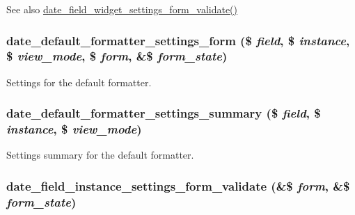 \begin{DoxySeeAlso}{See also}
\hyperlink{date__admin_8inc_a20ea5e4f157140ba68146345059d7a36}{date\_\-field\_\-widget\_\-settings\_\-form\_\-validate()} 
\end{DoxySeeAlso}
\hypertarget{date__admin_8inc_a59e2bd7bef099374be5eb236b835e72b}{
\subsubsection[{date\_\-default\_\-formatter\_\-settings\_\-form}]{\setlength{\rightskip}{0pt plus 5cm}date\_\-default\_\-formatter\_\-settings\_\-form (\$ {\em field}, \/  \$ {\em instance}, \/  \$ {\em view\_\-mode}, \/  \$ {\em form}, \/  \&\$ {\em form\_\-state})}}
\label{date__admin_8inc_a59e2bd7bef099374be5eb236b835e72b}
Settings for the default formatter. \hypertarget{date__admin_8inc_a03cbbb0167b3eb6f56bf5834af6d5241}{
\subsubsection[{date\_\-default\_\-formatter\_\-settings\_\-summary}]{\setlength{\rightskip}{0pt plus 5cm}date\_\-default\_\-formatter\_\-settings\_\-summary (\$ {\em field}, \/  \$ {\em instance}, \/  \$ {\em view\_\-mode})}}
\label{date__admin_8inc_a03cbbb0167b3eb6f56bf5834af6d5241}
Settings summary for the default formatter. \hypertarget{date__admin_8inc_a4a30fe673c9a4249ac93668b8c9e7bdc}{
\subsubsection[{date\_\-field\_\-instance\_\-settings\_\-form\_\-validate}]{\setlength{\rightskip}{0pt plus 5cm}date\_\-field\_\-instance\_\-settings\_\-form\_\-validate (\&\$ {\em form}, \/  \&\$ {\em form\_\-state})}}
